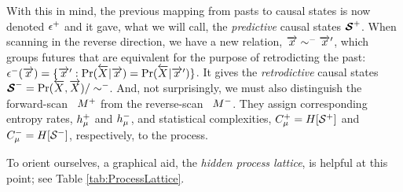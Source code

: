 With this in mind, the previous mapping from pasts to causal states is
now denoted $\epsilon^{+}$ and it gave, what we will call, the
\emph{predictive} causal states
${\boldsymbol{\mathcal{S}}}^{+}$. When scanning in the reverse direction, we
have a new relation, $\smash{\overrightarrow{{x}}} \sim^{-} \smash{\overrightarrow{{x}}}^\prime$, which groups futures
that are equivalent for the purpose of retrodicting the past:
$\epsilon^{-}(\smash{\overrightarrow{{x}}}) =
  \{ \smash{\overrightarrow{{x}}}^\prime: \Pr(\smash{\overleftarrow {{X}}}|\smash{\overrightarrow{{x}}}) = \Pr(\smash{\overleftarrow {{X}}}|\smash{\overrightarrow{{x}}}^\prime) \}$.
It gives the \emph{retrodictive} causal states
${\boldsymbol{\mathcal{S}}}^{-} = \Pr(\smash{\overleftarrow {{X}}},\smash{\overrightarrow{{X}}}) / \sim^{-}$.
And, not surprisingly, we must also distinguish the forward-scan
\eM\ ${M}^{+}$ from the reverse-scan \eM\ ${M}^{-}$. They assign
corresponding entropy rates, $h_\mu^{+}$ and $h_\mu^{-}$, and
statistical complexities, $C_\mu^{+} = H[{\mathcal{S}}^{+}]$
and $C_\mu^{-} = H[{\mathcal{S}}^{-}]$,
respectively, to the process.

To orient ourselves, a graphical aid, the \emph{hidden process lattice}, is
helpful at this point; see Table \ref{tab:ProcessLattice}.

